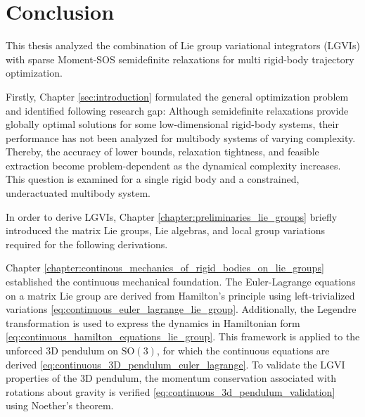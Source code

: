 \chapter{Conclusion}
\label{chap:conclusion}

This thesis analyzed the combination of Lie group
variational integrators (LGVIs) with sparse Moment-SOS semidefinite relaxations
for multi rigid-body trajectory optimization. 

Firstly, Chapter \ref{sec:introduction} 
formulated the general optimization problem and identified following research gap: Although
semidefinite relaxations provide globally optimal solutions for some low-dimensional
rigid-body systems, their performance has not been analyzed for multibody systems of
varying complexity.
Thereby, the accuracy of lower bounds, relaxation tightness, and feasible extraction become
problem-dependent as the dynamical complexity increases. This question is
examined for a single rigid body and a constrained, underactuated multibody
system.

In order to derive LGVIs, 
Chapter \ref{chapter:preliminaries_lie_groups} briefly introduced the matrix 
Lie groups, Lie algebras, and local
group variations required for the following derivations.

Chapter \ref{chapter:continous_mechanics_of_rigid_bodies_on_lie_groups} 
established the continuous mechanical foundation. The
Euler-Lagrange equations on a matrix Lie group are derived from Hamilton's
principle using left-trivialized variations \eqref{eq:continuous_euler_lagrange_lie_group}.
Additionally, the Legendre transformation is
used to express the dynamics in Hamiltonian form \eqref{eq:continuous_hamilton_equations_lie_group}. 
This framework is applied to
the unforced 3D pendulum on $\mathrm{SO}(3)$, for which the continuous equations
are derived \eqref{eq:continuous_3D_pendulum_euler_lagrange}. 
To validate the LGVI properties of the 3D pendulum,
the momentum conservation associated with rotations about gravity is
verified \eqref{eq:continuous_3d_pendulum_validation} using Noether's theorem.

